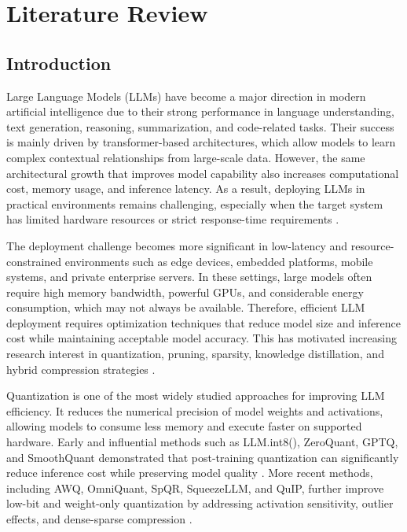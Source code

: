 
\chapter{Literature Review}
\label{Chapter3}

\section{Introduction}
\label{sec:lr-intro}

Large Language Models (LLMs) have become a major direction in modern artificial intelligence due to their strong performance in language understanding, text generation, reasoning, summarization, and code-related tasks. Their success is mainly driven by transformer-based architectures, which allow models to learn complex contextual relationships from large-scale data. However, the same architectural growth that improves model capability also increases computational cost, memory usage, and inference latency. As a result, deploying LLMs in practical environments remains challenging, especially when the target system has limited hardware resources or strict response-time requirements \cite{survey2021transformers,survey2021ondevice}.

The deployment challenge becomes more significant in low-latency and resource-constrained environments such as edge devices, embedded platforms, mobile systems, and private enterprise servers. In these settings, large models often require high memory bandwidth, powerful GPUs, and considerable energy consumption, which may not always be available. Therefore, efficient LLM deployment requires optimization techniques that reduce model size and inference cost while maintaining acceptable model accuracy. This has motivated increasing research interest in quantization, pruning, sparsity, knowledge distillation, and hybrid compression strategies \cite{frantar2023sparsegpt,ma2023llmpruner,sanh2020distilbert,jiao2020tinybert}.

Quantization is one of the most widely studied approaches for improving LLM efficiency. It reduces the numerical precision of model weights and activations, allowing models to consume less memory and execute faster on supported hardware. Early and influential methods such as LLM.int8(), ZeroQuant, GPTQ, and SmoothQuant demonstrated that post-training quantization can significantly reduce inference cost while preserving model quality \cite{dettmers2022llmint8,yao2022zeroquant,frantar2023gptq,xiao2023smoothquant}. More recent methods, including AWQ, OmniQuant, SpQR, SqueezeLLM, and QuIP, further improve low-bit and weight-only quantization by addressing activation sensitivity, outlier effects, and dense-sparse compression \cite{lin2024awq,dettmers2024spqr,shao2024omniquant,kim2024squeezellm,chee2023quip}.

